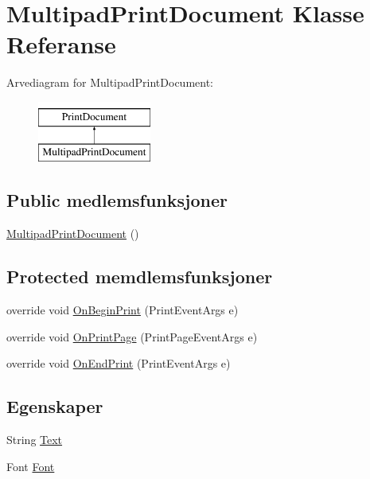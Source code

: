 \hypertarget{class_multipad_print_document}{\section{Multipad\+Print\+Document Klasse Referanse}
\label{class_multipad_print_document}
}
Arvediagram for Multipad\+Print\+Document\+:\begin{figure}[H]
\begin{center}
\leavevmode
\includegraphics[height=2.000000cm]{class_multipad_print_document}
\end{center}
\end{figure}
\subsection*{Public medlemsfunksjoner}
\begin{DoxyCompactItemize}
\item 
\hyperlink{class_multipad_print_document_abfc7a27a7d1ad64a21c77e20a83e420f}{Multipad\+Print\+Document} ()
\end{DoxyCompactItemize}
\subsection*{Protected memdlemsfunksjoner}
\begin{DoxyCompactItemize}
\item 
override void \hyperlink{class_multipad_print_document_ac451309e0952b87aac24e9c2faf89fb3}{On\+Begin\+Print} (Print\+Event\+Args e)
\item 
override void \hyperlink{class_multipad_print_document_af9ad8a7b3384fcf5607d7ad5a6e36b2d}{On\+Print\+Page} (Print\+Page\+Event\+Args e)
\item 
override void \hyperlink{class_multipad_print_document_acb19b2c896d69a4cfa1e10c5058b5185}{On\+End\+Print} (Print\+Event\+Args e)
\end{DoxyCompactItemize}
\subsection*{Egenskaper}
\begin{DoxyCompactItemize}
\item 
String \hyperlink{class_multipad_print_document_a9dcbcaa3ddbfc7d34fda92e5409e8723}{Text}
\item 
Font \hyperlink{class_multipad_print_document_aaf1813fbc532697e2d3bfb95c33f9d19}{Font}
\end{DoxyCompactItemize}
